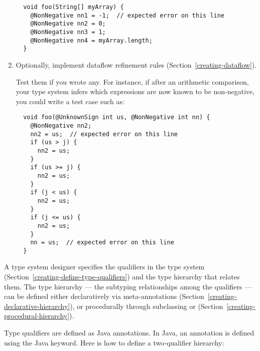 \begin{enumerate}
\begin{Verbatim}
  void foo(String[] myArray) {
    @NonNegative nn1 = -1;  // expected error on this line
    @NonNegative nn2 = 0;
    @NonNegative nn3 = 1;
    @NonNegative nn4 = myArray.length;
  }
\end{Verbatim}

\item
  Optionally, implement dataflow refinement rules
  (Section~\ref{creating-dataflow}).

  Test them if you wrote any.
  For instance, if after an arithmetic comparison, your type system infers
  which expressions are now known to be non-negative, you could write a
  test case such as:

\begin{Verbatim}
  void foo(@UnknownSign int us, @NonNegative int nn) {
    @NonNegative nn2;
    nn2 = us;  // expected error on this line
    if (us > j) {
      nn2 = us;
    }
    if (us >= j) {
      nn2 = us;
    }
    if (j < us) {
      nn2 = us;
    }
    if (j <= us) {
      nn2 = us;
    }
    nn = us;  // expected error on this line
  }
\end{Verbatim}

\end{enumerate}





A type system designer specifies the qualifiers in the type system (Section~\ref{creating-define-type-qualifiers})
and
the type hierarchy that relates them.
The type hierarchy --- the subtyping relationships among the qualifiers ---
can be defined either
declaratively via meta-annotations (Section~\ref{creating-declarative-hierarchy}), or procedurally through
subclassing  or
 (Section~\ref{creating-procedural-hierarchy}).




Type qualifiers are defined as Java annotations.  In Java, an
annotation is defined using the Java  keyword.
Here is how to define a two-qualifier hierarchy:

